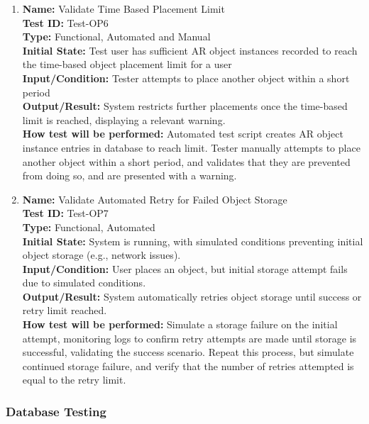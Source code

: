 \documentclass[12pt, titlepage]{article}
\begin{document}
\begin{enumerate}
\item \textbf{Name:} Validate Time Based Placement Limit \label{itm:Test-OP6} \\
\textbf{Test ID:} Test-OP6 \\
\textbf{Type:} Functional, Automated and Manual \\
\textbf{Initial State:} Test user has sufficient AR object instances recorded to reach the time-based object placement limit for a user \\
\textbf{Input/Condition:} Tester attempts to place another object within a short period \\
\textbf{Output/Result:} System restricts further placements once the time-based limit is reached, displaying a relevant warning. \\
\textbf{How test will be performed:} Automated test script creates AR object instance entries in database to reach limit. Tester manually attempts to place another object within a short period, and validates that they are prevented from doing so, and are presented with a warning.

\item \textbf{Name:} Validate Automated Retry for Failed Object Storage \label{itm:Test-OP7} \\
\textbf{Test ID:} Test-OP7 \\
\textbf{Type:} Functional, Automated \\
\textbf{Initial State:} System is running, with simulated conditions preventing initial object storage (e.g., network issues). \\
\textbf{Input/Condition:} User places an object, but initial storage attempt fails due to simulated conditions. \\
\textbf{Output/Result:} System automatically retries object storage until success or retry limit reached. \\
\textbf{How test will be performed:} Simulate a storage failure on the initial attempt, monitoring logs to confirm retry attempts are made until storage is successful, validating the success scenario. Repeat this process, but simulate continued storage failure, and verify that the number of retries attempted is equal to the retry limit.

\end{enumerate}

\subsubsection{Database Testing}
\end{document}
